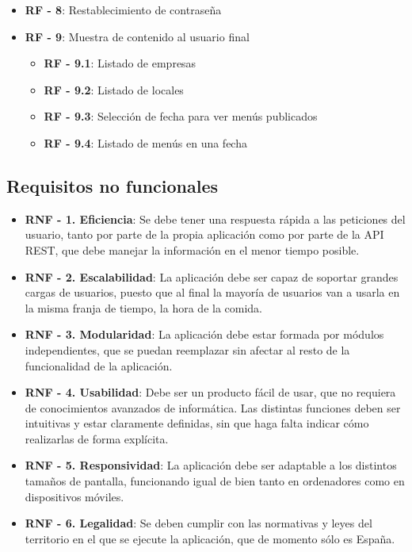 \begin{itemize}
	\item \textbf{RF - 8}: Restablecimiento de contraseña
	\item \textbf{RF - 9}: Muestra de contenido al usuario final
	\begin{itemize}
		\item \textbf{RF - 9.1}: Listado de empresas
		\item \textbf{RF - 9.2}: Listado de locales
		\item \textbf{RF - 9.3}: Selección de fecha para ver menús publicados
		\item \textbf{RF - 9.4}: Listado de menús en una fecha
	\end{itemize}
\end{itemize}

\subsection{Requisitos no funcionales}

\begin{itemize}
\item \textbf{RNF - 1. Eficiencia}: Se debe tener una respuesta rápida a las peticiones del usuario, tanto por parte de la propia aplicación como por parte de la API REST, que debe manejar la información en el menor tiempo posible.
\item \textbf{RNF - 2. Escalabilidad}: La aplicación debe ser capaz de soportar grandes cargas de usuarios, puesto que al final la mayoría de usuarios van a usarla en la misma franja de tiempo, la hora de la comida.
\item \textbf{RNF - 3. Modularidad}: La aplicación debe estar formada por módulos independientes, que se puedan reemplazar sin afectar al resto de la funcionalidad de la aplicación.
\item \textbf{RNF - 4. Usabilidad}: Debe ser un producto fácil de usar, que no requiera de conocimientos avanzados de informática. Las distintas funciones deben ser intuitivas y estar claramente definidas, sin que haga falta indicar cómo realizarlas de forma explícita.
\item \textbf{RNF - 5. Responsividad}: La aplicación debe ser adaptable a los distintos tamaños de pantalla, funcionando igual de bien tanto en ordenadores como en dispositivos móviles.
\item \textbf{RNF - 6. Legalidad}: Se deben cumplir con las normativas y leyes del territorio en el que se ejecute la aplicación, que de momento sólo es España.
\end{itemize}


